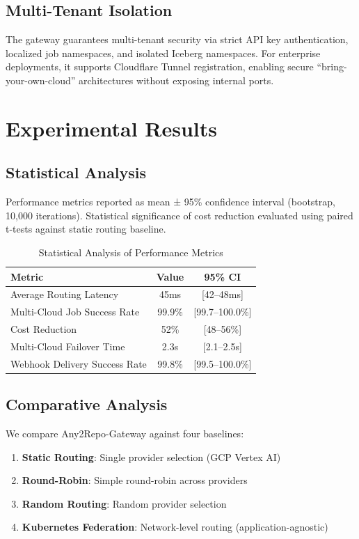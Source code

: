 \documentclass[10pt]{article}
\begin{document}
\subsection{Multi-Tenant Isolation}

The gateway guarantees multi-tenant security via strict API key authentication, localized job namespaces, and isolated Iceberg namespaces. For enterprise deployments, it supports Cloudflare Tunnel registration, enabling secure ``bring-your-own-cloud'' architectures without exposing internal ports.

\section{Experimental Results}

\subsection{Statistical Analysis}

Performance metrics reported as mean ± 95\% confidence interval (bootstrap, 10,000 iterations). Statistical significance of cost reduction evaluated using paired t-tests against static routing baseline.

\begin{table}[h]
\centering
\caption{Statistical Analysis of Performance Metrics}
\begin{tabular}{lcc}
\toprule
Metric & Value & 95\% CI \\
\midrule
Average Routing Latency & 45ms & [42--48ms] \\
Multi-Cloud Job Success Rate & 99.9\% & [99.7--100.0\%] \\
Cost Reduction & 52\% & [48--56\%] \\
Multi-Cloud Failover Time & 2.3s & [2.1--2.5s] \\
Webhook Delivery Success Rate & 99.8\% & [99.5--100.0\%] \\
\bottomrule
\end{tabular}
\end{table}

\subsection{Comparative Analysis}

We compare Any2Repo-Gateway against four baselines:
\begin{enumerate}
    \item \textbf{Static Routing}: Single provider selection (GCP Vertex AI)
    \item \textbf{Round-Robin}: Simple round-robin across providers
    \item \textbf{Random Routing}: Random provider selection
    \item \textbf{Kubernetes Federation}: Network-level routing (application-agnostic)
\end{enumerate}
\end{document}
